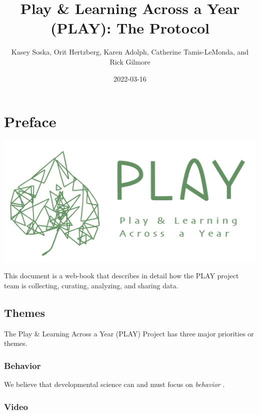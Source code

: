 \documentclass[
  12pt,
]{book}
\title{Play \& Learning Across a Year (PLAY): The Protocol}
\author{Kasey Soska, Orit Hertzberg, Karen Adolph, Catherine Tamis-LeMonda, and Rick Gilmore}
\date{2022-03-16}
\begin{document}
\maketitle

{
\setcounter{tocdepth}{1}
\tableofcontents
}
\hypertarget{preface}{%
\chapter*{Preface}\label{preface}}

\begin{center}\href{https://play-project.org}{\includegraphics[width=0.7\linewidth]{img/PLAY-logo} }\end{center}

This document is a web-book that describes in detail how the PLAY project team is collecting, curating, analyzing, and sharing data.

\hypertarget{themes}{%
\section*{Themes}\label{themes}}

The Play \& Learning Across a Year (PLAY) Project has three major priorities or themes.

\hypertarget{behavior}{%
\subsection*{Behavior}\label{behavior}}

We believe that developmental science can and must focus on \emph{behavior} \citep{Adolph2020-rj}.

\hypertarget{video}{%
\subsection*{Video}\label{video}}
\end{document}
